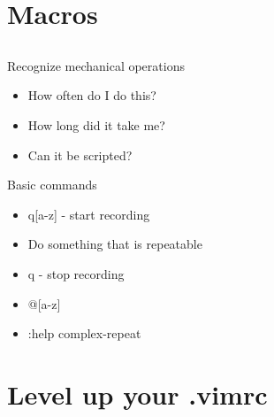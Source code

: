 \documentclass{beamer}
\begin{document}
    \section{Macros}
    \subsection{}
    \begin{frame}{Recognize mechanical operations}
        \begin{itemize}
            \item How often do I do this?
            \item How long did it take me?
            \item Can it be scripted?
        \end{itemize}
    \end{frame}
    \begin{frame}{Basic commands}
        \begin{itemize}
            \item q[a-z] - start recording
            \item Do something that is repeatable
            \item q - stop recording
            \item @[a-z]
            \item :help complex-repeat
        \end{itemize}
    \end{frame}
    \section{Level up your .vimrc}
\end{document}
